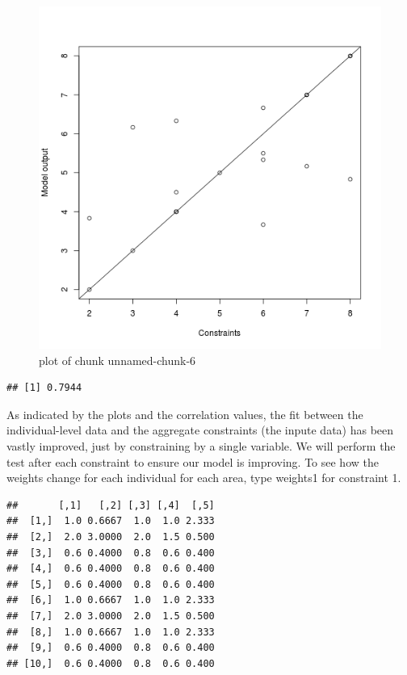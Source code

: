 \begin{figure}[htbp]
\centering
\includegraphics{figure/unnamed-chunk-6.png}
\caption{plot of chunk unnamed-chunk-6}
\end{figure}

\begin{Shaded}
\begin{Highlighting}[]
\NormalTok{(}\NormalTok{(}\NormalTok{(}
\end{Highlighting}
\end{Shaded}
\begin{verbatim}
## [1] 0.7944
\end{verbatim}
As indicated by the plots and the correlation values, the fit between
the individual-level data and the aggregate constraints (the inpute
data) has been vastly improved, just by constraining by a single
variable. We will perform the test after each constraint to ensure our
model is improving. To see how the weights change for each individual
for each area, type weights1 for constraint 1.

\begin{Shaded}
\begin{Highlighting}[]
\end{Highlighting}
\end{Shaded}
\begin{verbatim}
##       [,1]   [,2] [,3] [,4]  [,5]
##  [1,]  1.0 0.6667  1.0  1.0 2.333
##  [2,]  2.0 3.0000  2.0  1.5 0.500
##  [3,]  0.6 0.4000  0.8  0.6 0.400
##  [4,]  0.6 0.4000  0.8  0.6 0.400
##  [5,]  0.6 0.4000  0.8  0.6 0.400
##  [6,]  1.0 0.6667  1.0  1.0 2.333
##  [7,]  2.0 3.0000  2.0  1.5 0.500
##  [8,]  1.0 0.6667  1.0  1.0 2.333
##  [9,]  0.6 0.4000  0.8  0.6 0.400
## [10,]  0.6 0.4000  0.8  0.6 0.400
\end{verbatim}
